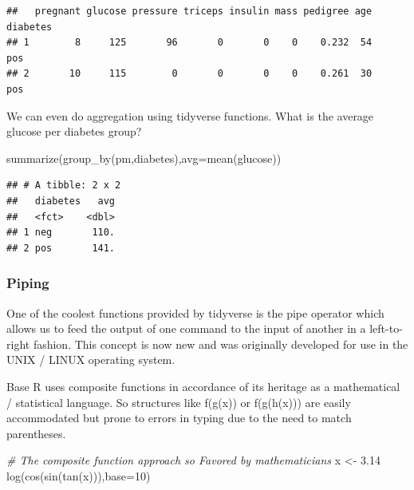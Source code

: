 \documentclass[
]{article}
\newenvironment{Shaded}{\begin{snugshade}}{\end{snugshade}}
\newcommand{\AttributeTok}[1]{\textcolor[rgb]{0.77,0.63,0.00}{#1}}
\newcommand{\CommentTok}[1]{\textcolor[rgb]{0.56,0.35,0.01}{\textit{#1}}}
\newcommand{\DecValTok}[1]{\textcolor[rgb]{0.00,0.00,0.81}{#1}}
\newcommand{\FloatTok}[1]{\textcolor[rgb]{0.00,0.00,0.81}{#1}}
\newcommand{\FunctionTok}[1]{\textcolor[rgb]{0.00,0.00,0.00}{#1}}
\newcommand{\NormalTok}[1]{#1}
\newcommand{\OtherTok}[1]{\textcolor[rgb]{0.56,0.35,0.01}{#1}}
\begin{document}
\begin{verbatim}
##   pregnant glucose pressure triceps insulin mass pedigree age diabetes
## 1        8     125       96       0       0    0    0.232  54      pos
## 2       10     115        0       0       0    0    0.261  30      pos
\end{verbatim}

We can even do aggregation using tidyverse functions. What is the
average glucose per diabetes group?

\begin{Shaded}
\begin{Highlighting}[]
\FunctionTok{summarize}\NormalTok{(}\FunctionTok{group\_by}\NormalTok{(pm,diabetes),}\AttributeTok{avg=}\FunctionTok{mean}\NormalTok{(glucose))}
\end{Highlighting}
\end{Shaded}

\begin{verbatim}
## # A tibble: 2 x 2
##   diabetes   avg
##   <fct>    <dbl>
## 1 neg       110.
## 2 pos       141.
\end{verbatim}

\hypertarget{piping}{%
\subsubsection{Piping}\label{piping}}

One of the coolest functions provided by tidyverse is the pipe operator
which allows us to feed the output of one command to the input of
another in a left-to-right fashion. This concept is now new and was
originally developed for use in the UNIX / LINUX operating system.

Base R uses composite functions in accordance of its heritage as a
mathematical / statistical language. So structures like f(g(x)) or
f(g(h(x))) are easily accommodated but prone to errors in typing due to
the need to match parentheses.

\begin{Shaded}
\begin{Highlighting}[]
\CommentTok{\# The composite function approach so Favored by mathematicians }
\NormalTok{x }\OtherTok{\textless{}{-}} \FloatTok{3.14}
\FunctionTok{log}\NormalTok{(}\FunctionTok{cos}\NormalTok{(}\FunctionTok{sin}\NormalTok{(}\FunctionTok{tan}\NormalTok{(x))),}\AttributeTok{base=}\DecValTok{10}\NormalTok{)}
\end{Highlighting}
\end{Shaded}
\end{document}
